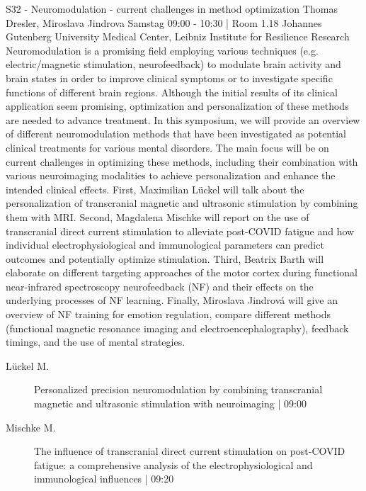 
            \begin{symposium}
            {S32 - Neuromodulation - current challenges in method optimization}
            {Thomas Dresler, Miroslava Jindrova}
            {Samstag 09:00 - 10:30 | Room 1.18}
            {Johannes Gutenberg University Medical Center, Leibniz Institute for Resilience Research}
            Neuromodulation is a promising field employing various techniques (e.g. electric/magnetic stimulation, neurofeedback) to modulate brain activity and brain states in order to improve clinical symptoms or to investigate specific functions of different brain regions. Although the initial results of its clinical application seem promising, optimization and personalization of these methods are needed to advance treatment. In this symposium, we will provide an overview of different neuromodulation methods that have been investigated as potential clinical treatments for various mental disorders. The main focus will be on current challenges in optimizing these methods, including their combination with various neuroimaging modalities to achieve personalization and enhance the intended clinical effects. First, Maximilian Lückel will talk about the personalization of transcranial magnetic and ultrasonic stimulation by combining them with MRI. Second, Magdalena Mischke will report on the use of transcranial direct current stimulation to alleviate post-COVID fatigue and how individual electrophysiological and immunological parameters can predict outcomes and potentially optimize stimulation. Third, Beatrix Barth will elaborate on different targeting approaches of the motor cortex during functional near-infrared spectroscopy neurofeedback (NF) and their effects on the underlying processes of NF learning. Finally, Miroslava Jindrová will give an overview of NF training for emotion regulation, compare different methods (functional magnetic resonance imaging and electroencephalography), feedback timings, and the use of mental strategies.
            \begin{description}    
            
                \item [ Lückel M.] Personalized precision neuromodulation by combining transcranial magnetic and ultrasonic stimulation with neuroimaging \textcolor{mygray}{ | 09:00}    
                
                \item [ Mischke M.] The influence of transcranial direct current stimulation on post-COVID fatigue: a comprehensive analysis of the electrophysiological and immunological influences \textcolor{mygray}{ | 09:20}    
                

\end{description}
\end{symposium}

